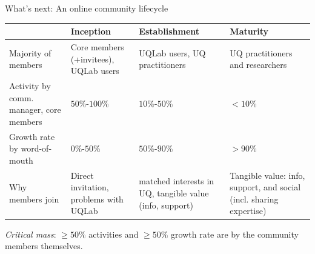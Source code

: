 \documentclass[]{rsuqbeamernew}
\begin{document}
\begin{frame}[t]{What's next: An online community lifecycle}

\begin{tabularx}{\textwidth}{XXXX}
  \hline
                                    & Inception    & Establishment  & Maturity \\
  \hline
  \footnotesize{Majority of members}
  & Core members (+invitees), UQLab users
  & UQLab users, UQ practitioners
  & UQ practitioners and researchers  \\
  
  \footnotesize{Activity by comm. manager, core members}
  & $50$\%-$100$\%
  & $10$\%-$50$\% 
  & $<10$\% \\
  
  \footnotesize{Growth rate by word-of-mouth}
  & $0$\%-$50$\% 
  & $50$\%-$90$\%
  & $>90$\% \\
  
  \footnotesize{Why members join}
  & Direct invitation, problems with UQLab
  & matched interests in UQ, tangible value (info, support)
  & Tangible value: info, support, and social (incl. sharing expertise) \\
  \hline
\end{tabularx}

\vspace{0.35cm}

\emph{Critical mass}: $\geq 50\%$ activities and $\geq 50\%$ growth rate
are by the community members themselves.

\end{frame}
\end{document}
